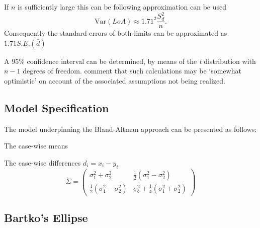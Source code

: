 \documentclass[12pt, a4paper]{report}
\theoremstyle{plain}
\theoremstyle{definition}
\theoremstyle{remark}
\begin{document}
If $n$ is sufficiently large this can be following approximation
can be used
\begin{equation}
\mbox{Var}(LoA) \approx 1.71^{2}\frac{S_{d}^{2}}{n}.
\end{equation}
Consequently the standard errors of both limits can be
approximated as $1.71 S.E.(\bar{d})$

A $95\%$ confidence interval can be determined, by means of the
\emph{t} distribution with $n-1$ degrees of freedom. \citet*{BA99} comment that such calculations  may be `somewhat
optimistic' on account of the associated assumptions not being
realized.

%	
%	



\subsection{Model Specification}
The model underpinning the Bland-Altman approach can be presented as follows:

The case-wise means

The case-wise differences $d_i = x_i - y_i$
\[
\Sigma = \left( \begin{array}{cc}
\sigma^2_1 + \sigma^2_2 &  \frac{1}{2}(\sigma^2_1 - \sigma^2_2) \\
\frac{1}{2}(\sigma^2_1 - \sigma^2_2) &   \sigma^2_b + \frac{1}{4}(\sigma^2_1 + \sigma^2_2)
\end{array}\right)
\]


\subsection{Bartko's Ellipse}
	
\end{document}
